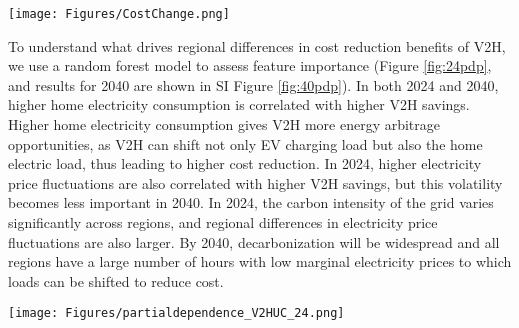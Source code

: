 \documentclass[11pt,preprint]{elsarticle}
\begin{document}
\begin{figure*}[!ht]
    \centering
    \texttt{[image: Figures/CostChange.png]}
    \caption{Median changes in annual and lifetime charging costs, when EV owners switch from uncontrolled charging or controlled charging to V2H, or from uncontrolled charging to controlled charging, of each region across the US. Charging costs are defined as a net increase in electricity bills for the whole home after EV charging is introduced. V2H (no heat pump): V2H for homes without electrified space heating using heat pumps.}
    \label{fig:costchange}
\end{figure*}

To understand what drives regional differences in cost reduction benefits of V2H, we use a random forest model to assess feature importance (Figure \ref{fig:24pdp}, and results for 2040 are shown in SI Figure \ref{fig:40pdp}). In both 2024 and 2040, higher home electricity consumption is correlated with higher V2H savings. Higher home electricity consumption gives V2H more energy arbitrage opportunities, as V2H can shift not only EV charging load but also the home electric load, thus leading to higher cost reduction. In 2024, higher electricity price fluctuations are also correlated with higher V2H savings, but this volatility becomes less important in 2040. In 2024, the carbon intensity of the grid varies significantly across regions, and regional differences in electricity price fluctuations are also larger. By 2040, decarbonization will be widespread and all regions have a large number of hours with low marginal electricity prices to which loads can be shifted to reduce cost. 

\begin{figure*}[!ht]
    \centering
    \texttt{[image: Figures/partialdependence\_V2HUC\_24.png]}
    \caption{Partial dependence plot of cost reduction benefits of V2H compared with uncontrolled charging on selected independent variables from 2024 results and inputs. A random forest algorithm is used to fit the model. Data points involved in this analysis are county medians. The Y-axis denotes the predicted outcome of the fitted model, in annual charging cost changes. The smaller the outcome, the higher the savings. The 3rd to 8th features are annual generation mix (\%) of respective fuel type``. 'NG generation' stands for natural gas generation. }
    \label{fig:24pdp}
\end{figure*}
\end{document}
